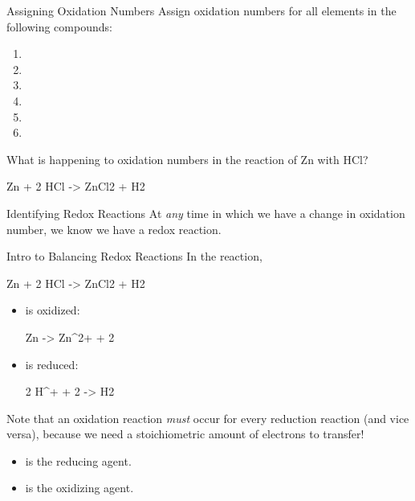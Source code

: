 \documentclass[notes=only]{beamer}
\begin{document}
\begin{frame}[t]{Assigning Oxidation Numbers}
	Assign oxidation numbers for all elements in the following compounds:

	\begin{multicols}{2}
	\begin{enumerate}
		\item {}
		\item {}
		\item {}
		\item {}
		\item {}
		\item {}
	\end{enumerate}
	\end{multicols}

	\pause

	What is happening to oxidation numbers in the reaction of Zn with HCl?
	\begin{reaction*}
		Zn\sld{} + 2 HCl\aq{} -> ZnCl2\aq{} + H2\gas{}
	\end{reaction*}

	\pause

	\begin{block}{Identifying Redox Reactions}
		At \emph{any} time in which we have a \alert{change} in oxidation
		number, we know we have a \alert{redox} reaction.
	\end{block}
\end{frame}


\begin{frame}{Intro to Balancing Redox Reactions}
	In the reaction,
	\begin{reaction*}
		Zn\sld{} + 2 HCl\aq{} -> ZnCl2\aq{} + H2\gas{}
	\end{reaction*}

	\begin{itemize}
		\item {} is \alert{oxidized}:
			\begin{reaction*}
				Zn\sld{} -> Zn^{2+}\aq{} + 2 \el{}
			\end{reaction*}
		\item {} is \alert{reduced}:
			\begin{reaction*}
				2 H^{+}\aq{} + 2 \el{} -> H2\gas{}
			\end{reaction*}
	\end{itemize}

	\pause

	Note that an oxidation reaction \emph{must} occur for every reduction
	reaction (and vice versa), because we need a \alert{stoichiometric}
	amount of electrons to \alert{transfer}!
	\begin{itemize}
		\item {} is the \alert{reducing agent}.
		\item {} is the \alert{oxidizing agent}.
	\end{itemize}
\end{frame}
\end{document}
